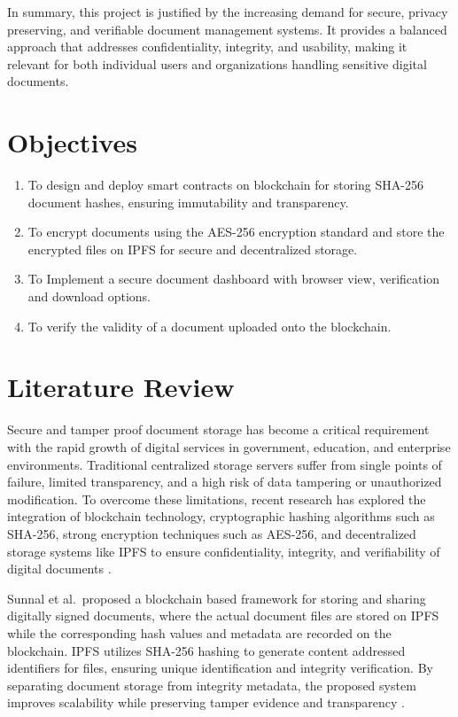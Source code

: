 \documentclass[12pt]{article}
\begin{document}
In summary, this project is justified by the increasing demand for secure, privacy preserving, and verifiable document management systems. It provides a balanced approach that addresses confidentiality, integrity, and usability, making it relevant for both individual users and organizations handling sensitive digital documents.

\newpage
\section{Objectives}
\begin{enumerate}
\item To design and deploy smart contracts on blockchain for storing SHA-256 document hashes, ensuring immutability and transparency.
\item To encrypt documents using the AES-256 encryption standard and store the encrypted files on IPFS for secure and decentralized storage.
\item To Implement a secure document  dashboard with browser view, verification and download options.
\item To verify the validity of a document uploaded onto the blockchain.
\end{enumerate}
\newpage
\section{Literature Review}

Secure and tamper proof document storage has become a critical requirement with the rapid growth of digital services in government, education, and enterprise environments. Traditional centralized storage servers suffer from single points of failure, limited transparency, and a high risk of data tampering or unauthorized modification. To overcome these limitations, recent research has explored the integration of blockchain technology, cryptographic hashing algorithms such as SHA-256, strong encryption techniques such as AES-256, and decentralized storage systems like IPFS to ensure confidentiality, integrity, and verifiability of digital documents \cite{arxiv2205}.

Sunnal et al.\ proposed a blockchain based framework for storing and sharing digitally signed documents, where the actual document files are stored on IPFS while the corresponding hash values and metadata are recorded on the blockchain. IPFS utilizes SHA-256 hashing to generate content addressed identifiers for files, ensuring unique identification and integrity verification. By separating document storage from integrity metadata, the proposed system improves scalability while preserving tamper evidence and transparency \cite{sunnal2023}.
\end{document}
